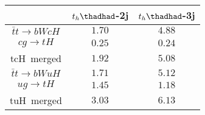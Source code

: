 
\centering
\begin{tabular}{ccc} \toprule\toprule
& $t_{h}\thadhad$-2j & $t_{h}\thadhad$-3j\\\midrule
$\bar{t}t\to bWcH$ & $1.70$ & $4.88$ \\
$cg\to tH$ &  $0.25$        & $0.24$ \\
tcH~merged &  $1.92$        & $5.08$  \\
$\bar{t}t\to bWuH$ & $1.71$ & $5.12$   \\
$ug\to tH$ & $1.45$         & $1.18$   \\
tuH~merged & $3.03$         & $6.13$   \\
\bottomrule\bottomrule
\end{tabular}
